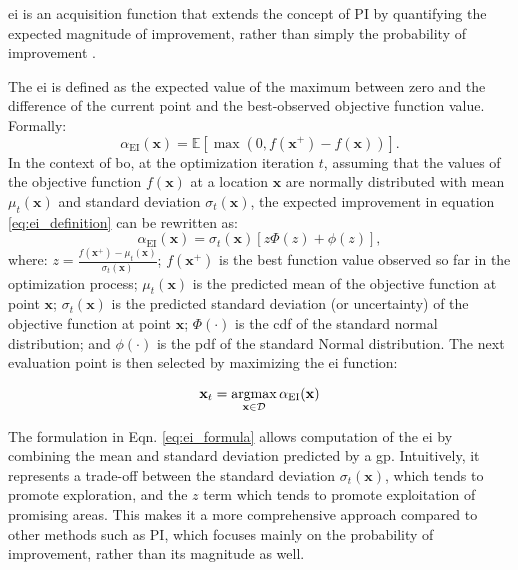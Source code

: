 \acf{ei} is an acquisition function that extends the concept of \ac{PI} by quantifying the expected magnitude of improvement, rather than simply the probability of improvement \citep{mockus1978application, jones1998efficient}. 

The \ac{ei} is defined as the expected value of the maximum between zero and the difference of the current point and the best-observed objective function value. Formally:
\begin{equation*}
\alpha_{\text{EI}}(\mathbf{x}) = \mathbb{E} [\max(0, f(\mathbf{x}^+) - f(\mathbf{x}))].
\label{eq:ei_definition}
\end{equation*}
In the context of \ac{bo}, at the optimization iteration $t$, assuming that the values of the objective function \(f(\mathbf{x})\) at a location \(\mathbf{x}\) are normally distributed with mean \(\mu_t(\mathbf{x})\) and standard deviation \(\sigma_t(\mathbf{x})\), the expected improvement in equation \eqref{eq:ei_definition} can be rewritten as:
\begin{equation*}
    \alpha_{\text{EI}}(\mathbf{x}) = \sigma_t(\mathbf{x}) [ z \Phi(z) + \phi(z) ],
    \label{eq:ei_formula}
\end{equation*}
where: \(z =  \frac{f(\mathbf{x}^+) - \mu_t(\mathbf{x})}{\sigma_t(\mathbf{x})}\); \(f(\mathbf{x}^+)\) is the best function value observed so far in the optimization process; \(\mu_t(\mathbf{x})\) is the predicted mean of the objective function at point \(\mathbf{x}\); \(\sigma_t(\mathbf{x})\) is the predicted standard deviation (or uncertainty) of the objective function at point \(\mathbf{x}\); \(\Phi(\cdot)\) is the \ac{cdf} of the standard normal distribution; and \(\phi(\cdot)\) is the \ac{pdf} of the standard Normal distribution. The next evaluation point is then selected by maximizing the \ac{ei} function:

\[
\mathbf{x}_t = \operatorname*{argmax}_{\mathbf{x} \in \mathcal{D}}  \alpha_{\text{EI}}(\mathbf{x})
\]

The formulation in Eqn. \eqref{eq:ei_formula} allows computation of the \ac{ei} by combining the mean and standard deviation predicted by a \ac{gp}. Intuitively, it represents a trade-off between the standard deviation \(\sigma_t(\mathbf{x})\), which tends to promote exploration, and the \(z\) term which tends to promote exploitation of promising areas. This makes it a more comprehensive approach compared to other methods such as \ac{PI}, which focuses mainly on the probability of improvement, rather than its magnitude as well.

